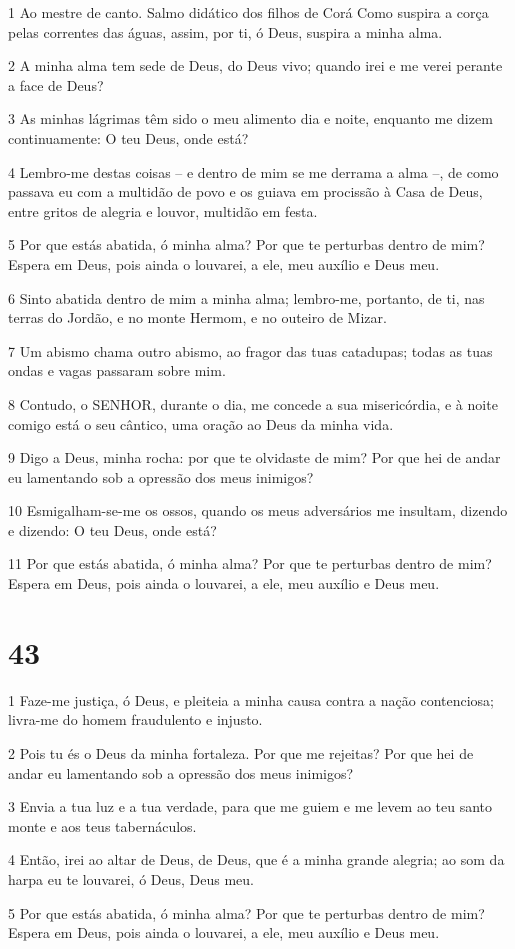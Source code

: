 \par 1 Ao mestre de canto. Salmo didático dos filhos de Corá Como suspira a corça pelas correntes das águas, assim, por ti, ó Deus, suspira a minha alma.
\par 2 A minha alma tem sede de Deus, do Deus vivo; quando irei e me verei perante a face de Deus?
\par 3 As minhas lágrimas têm sido o meu alimento dia e noite, enquanto me dizem continuamente: O teu Deus, onde está?
\par 4 Lembro-me destas coisas -- e dentro de mim se me derrama a alma --, de como passava eu com a multidão de povo e os guiava em procissão à Casa de Deus, entre gritos de alegria e louvor, multidão em festa.
\par 5 Por que estás abatida, ó minha alma? Por que te perturbas dentro de mim? Espera em Deus, pois ainda o louvarei, a ele, meu auxílio e Deus meu.
\par 6 Sinto abatida dentro de mim a minha alma; lembro-me, portanto, de ti, nas terras do Jordão, e no monte Hermom, e no outeiro de Mizar.
\par 7 Um abismo chama outro abismo, ao fragor das tuas catadupas; todas as tuas ondas e vagas passaram sobre mim.
\par 8 Contudo, o SENHOR, durante o dia, me concede a sua misericórdia, e à noite comigo está o seu cântico, uma oração ao Deus da minha vida.
\par 9 Digo a Deus, minha rocha: por que te olvidaste de mim? Por que hei de andar eu lamentando sob a opressão dos meus inimigos?
\par 10 Esmigalham-se-me os ossos, quando os meus adversários me insultam, dizendo e dizendo: O teu Deus, onde está?
\par 11 Por que estás abatida, ó minha alma? Por que te perturbas dentro de mim? Espera em Deus, pois ainda o louvarei, a ele, meu auxílio e Deus meu.

\chapter{43}

\par 1 Faze-me justiça, ó Deus, e pleiteia a minha causa contra a nação contenciosa; livra-me do homem fraudulento e injusto.
\par 2 Pois tu és o Deus da minha fortaleza. Por que me rejeitas? Por que hei de andar eu lamentando sob a opressão dos meus inimigos?
\par 3 Envia a tua luz e a tua verdade, para que me guiem e me levem ao teu santo monte e aos teus tabernáculos.
\par 4 Então, irei ao altar de Deus, de Deus, que é a minha grande alegria; ao som da harpa eu te louvarei, ó Deus, Deus meu.
\par 5 Por que estás abatida, ó minha alma? Por que te perturbas dentro de mim? Espera em Deus, pois ainda o louvarei, a ele, meu auxílio e Deus meu.

